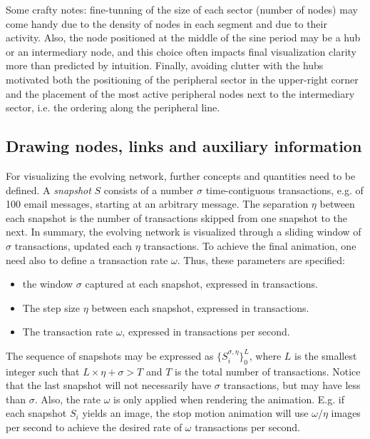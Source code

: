 \documentclass[runningheads]{llncs}
\begin{document}
\noindent Some crafty notes: fine-tunning of the size of each sector (number of nodes) may come handy due to the density of nodes in each segment and due to their activity. Also, the node positioned at the middle of the sine period may be a hub or an intermediary node, and this choice often impacts final visualization clarity more than predicted by intuition.
Finally, 
avoiding clutter with the hubs motivated both 
the positioning of the peripheral sector in the upper-right corner and
the placement of the most active peripheral nodes next to the intermediary sector, i.e. the ordering along the peripheral line.

\subsection{Drawing nodes, links and auxiliary information}
For visualizing the evolving network, further concepts and quantities need to be defined.
A \emph{snapshot} $S$ consists of a number $\sigma$ time-contiguous transactions, e.g. of 100 email messages, starting at an arbitrary message.
The separation $\eta$ between each snapshot is the number of transactions skipped from one snapshot to the next.
In summary, the evolving network is visualized through a sliding window of $\sigma$ transactions, updated each $\eta$ transactions. To achieve the final animation, one need also to define a transaction rate $\omega$.
Thus, these parameters are specified:
\begin{itemize}
  \item the window $\sigma$ captured at each snapshot, expressed in transactions.
  \item The step size $\eta$ between each snapshot, expressed in transactions.
  \item The transaction rate $\omega$, expressed in transactions per second.
\end{itemize}

\noindent The sequence of snapshots may be expressed as $\{S_i^{\sigma, \eta}\}_0^{L}$, where $L$ is the smallest integer such that $L\times \eta + \sigma > T$ and $T$ is the total number of transactions. Notice that the last snapshot will not necessarily have $\sigma$ transactions, but may have less than $\sigma$. Also, the rate $\omega$ is only applied when rendering the animation. E.g. if each snapshot $S_i$ yields an image, the stop motion animation will use $\omega/\eta$ images per second to achieve the desired rate of $\omega$ transactions per second.
\end{document}
